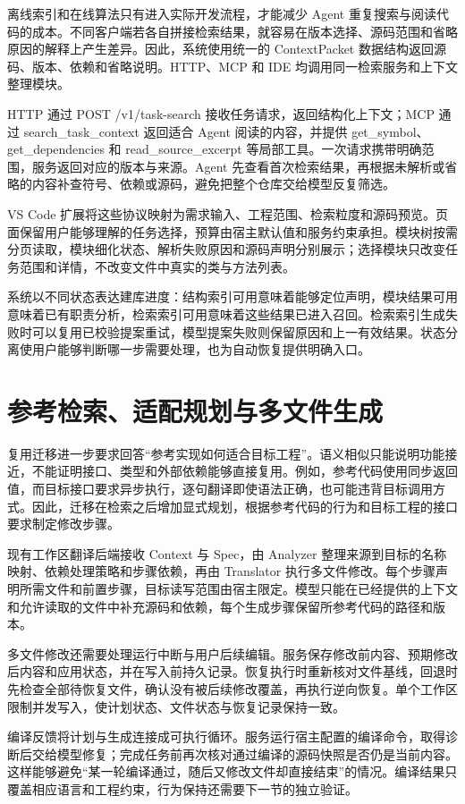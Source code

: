 离线索引和在线算法只有进入实际开发流程，才能减少 Agent 重复搜索与阅读代码的成本。不同客户端若各自拼接检索结果，就容易在版本选择、源码范围和省略原因的解释上产生差异。因此，系统使用统一的 ContextPacket 数据结构返回源码、版本、依赖和省略说明。HTTP、MCP 和 IDE 均调用同一检索服务和上下文整理模块。

HTTP 通过 POST /v1/task-search 接收任务请求，返回结构化上下文；MCP 通过 search\_task\_context 返回适合 Agent 阅读的内容，并提供 get\_symbol、get\_dependencies 和 read\_source\_excerpt 等局部工具。一次请求携带明确范围，服务返回对应的版本与来源。Agent 先查看首次检索结果，再根据未解析或省略的内容补查符号、依赖或源码，避免把整个仓库交给模型反复筛选。

VS Code 扩展将这些协议映射为需求输入、工程范围、检索粒度和源码预览。页面保留用户能够理解的任务选择，预算由宿主默认值和服务约束承担。模块树按需分页读取，模块细化状态、解析失败原因和源码声明分别展示；选择模块只改变任务范围和详情，不改变文件中真实的类与方法列表。

系统以不同状态表达建库进度：结构索引可用意味着能够定位声明，模块结果可用意味着已有职责分析，检索索引可用意味着这些结果已进入召回。检索索引生成失败时可以复用已校验提案重试，模型提案失败则保留原因和上一有效结果。状态分离使用户能够判断哪一步需要处理，也为自动恢复提供明确入口。

\section{参考检索、适配规划与多文件生成}

复用迁移进一步要求回答“参考实现如何适合目标工程”。语义相似只能说明功能接近，不能证明接口、类型和外部依赖能够直接复用。例如，参考代码使用同步返回值，而目标接口要求异步执行，逐句翻译即使语法正确，也可能违背目标调用方式。因此，迁移在检索之后增加显式规划，根据参考代码的行为和目标工程的接口要求制定修改步骤。

现有工作区翻译后端接收 Context 与 Spec，由 Analyzer 整理来源到目标的名称映射、依赖处理策略和步骤依赖，再由 Translator 执行多文件修改。每个步骤声明所需文件和前置步骤，目标读写范围由宿主限定。模型只能在已经提供的上下文和允许读取的文件中补充源码和依赖，每个生成步骤保留所参考代码的路径和版本。

多文件修改还需要处理运行中断与用户后续编辑。服务保存修改前内容、预期修改后内容和应用状态，并在写入前持久记录。恢复执行时重新核对文件基线，回退时先检查全部待恢复文件，确认没有被后续修改覆盖，再执行逆向恢复。单个工作区限制并发写入，使计划状态、文件状态与恢复记录保持一致。

编译反馈将计划与生成连接成可执行循环。服务运行宿主配置的编译命令，取得诊断后交给模型修复；完成任务前再次核对通过编译的源码快照是否仍是当前内容。这样能够避免“某一轮编译通过，随后又修改文件却直接结束”的情况。编译结果只覆盖相应语言和工程约束，行为保持还需要下一节的独立验证。

